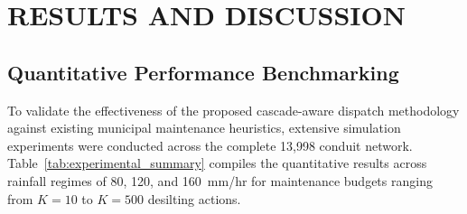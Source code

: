 \chapter{RESULTS AND DISCUSSION}

\section{Quantitative Performance Benchmarking}
To validate the effectiveness of the proposed cascade-aware dispatch methodology against existing municipal maintenance heuristics, extensive simulation experiments were conducted across the complete 13,998 conduit network. Table~\ref{tab:experimental_summary} compiles the quantitative results across rainfall regimes of 80, 120, and 160~mm/hr for maintenance budgets ranging from $K = 10$ to $K = 500$ desilting actions.


